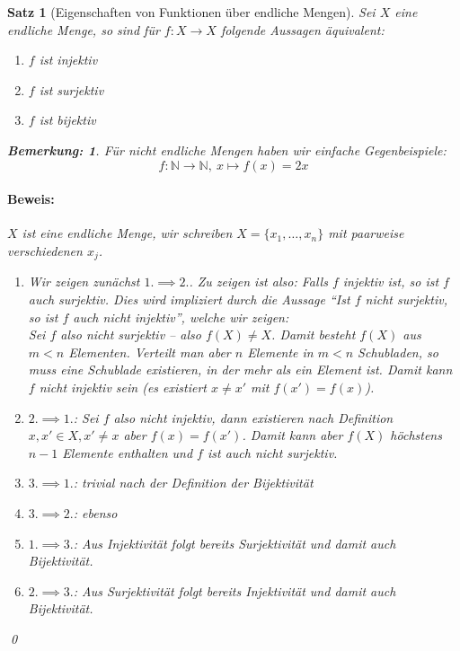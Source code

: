 \documentclass{report}
\newcommand{\N}{\mathbb{N}}
\theoremstyle{customrem}
\newtheorem*{bemerkung}{Bemerkung\textnormal:}
\theoremstyle{customdef}
\newtheorem{satz}[definition]{Satz}
\renewenvironment{proof}{\paragraph{Beweis: }}{\qed}
\begin{document}
	\begin{satz}[Eigenschaften von Funktionen über endliche Mengen]
		Sei $X$ eine endliche Menge, so sind für $f : X \to X$ folgende Aussagen äquivalent:
		\begin{enumerate}
			\itemsep0cm
			\item $f$ ist injektiv 
			\item $f$ ist surjektiv
			\item $f$ ist bijektiv
		\end{enumerate}
		
		\begin{bemerkung}
			Für nicht endliche Mengen haben wir einfache Gegenbeispiele:
			$$f : \N \to \N,\ x \mapsto f(x) = 2x$$
		\end{bemerkung}
		
		\begin{proof}
			$X$ ist eine endliche Menge, wir schreiben $X = \{x_1, \dots, x_n\}$ mit paarweise verschiedenen $x_j$.
			\begin{enumerate}
				\item[i)] Wir zeigen zunächst $1. \implies 2.$. Zu zeigen ist also: Falls $f$ injektiv ist, so ist $f$ auch surjektiv. Dies wird impliziert durch die Aussage "`Ist $f$ \textit{nicht} surjektiv, so ist $f$ auch \textit{nicht} injektiv"', welche wir zeigen:\\
				Sei $f$ also nicht surjektiv -- also $f(X) \neq X$. Damit besteht $f(X)$ aus $m < n$ Elementen. Verteilt man aber $n$ Elemente in $m < n$ Schubladen, so muss eine Schublade existieren, in der mehr als ein Element ist. Damit kann $f$ nicht injektiv sein (es existiert $x \neq x'$ mit $f(x') = f(x)$).
				\item[ii)] $2. \implies 1.$: Sei $f$ also nicht injektiv, dann existieren nach Definition $x, x' \in X, x' \neq x$ aber $f(x) = f(x')$. Damit kann aber $f(X)$ höchstens $n-1$ Elemente enthalten und $f$ ist auch nicht surjektiv.
				\item[iii)] $3. \implies 1.$: trivial nach der Definition der Bijektivität
				\item[iv)] $3. \implies 2.$: ebenso
				\item[v)] $1. \implies 3.$: Aus Injektivität folgt bereits Surjektivität und damit auch Bijektivität.
				\item[vi)] $2. \implies 3.$: Aus Surjektivität folgt bereits Injektivität und damit auch Bijektivität.
			\end{enumerate}
		\end{proof}
	\end{satz}
	
\end{document}

